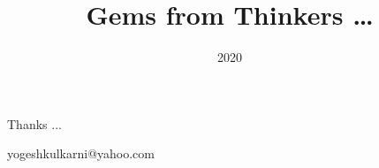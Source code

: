 \documentclass[xcolor=dvipsnames,compress,t,pdf,9pt]{beamer}
\title[\hspace{4cm} \insertframenumber /\inserttotalframenumber]
{Gems from Thinkers \ldots}
\date{2020}
\begin{document}
\begin{frame}
\titlepage
\end{frame}

\begin{frame}[c]{}
Thanks ...

\vspace{5mm}
yogeshkulkarni@yahoo.com
\end{frame}
\end{document}
